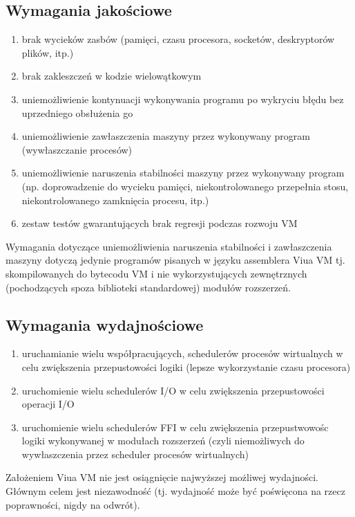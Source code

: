 \documentclass[11pt,oneside,a4paper,titlepage,onecolumn]{article}
\begin{document}
\subsection{Wymagania jakościowe}

\begin{enumerate}
    \item brak wycieków zasbów (pamięci, czasu procesora, socketów, deskryptorów plików, itp.)
    \item brak zakleszczeń w kodzie wielowątkowym
    \item uniemożliwienie kontynuacji wykonywania programu po wykryciu błędu bez uprzedniego obsłużenia go
    \item uniemożliwienie zawłaszczenia maszyny przez wykonywany program (wywłaszczanie procesów)
    \item uniemożliwienie naruszenia stabilności maszyny przez wykonywany program (np. doprowadzenie do
        wycieku pamięci, niekontrolowanego przepełnia stosu, niekontrolowanego zamknięcia procesu, itp.)
    \item zestaw testów gwarantujących brak regresji podczas rozwoju VM
\end{enumerate}

Wymagania dotyczące uniemożliwienia naruszenia stabilności i zawłaszczenia maszyny dotyczą jedynie programów
pisanych w języku assemblera Viua VM tj. skompilowanych do bytecodu VM i nie wykorzystujących zewnętrznych
(pochodzących spoza biblioteki standardowej) modułów rozszerzeń.

\subsection{Wymagania wydajnościowe}

\begin{enumerate}
    \item uruchamianie wielu współpracujących, schedulerów procesów wirtualnych w celu zwiększenia
        przepustowości logiki (lepsze wykorzystanie czasu procesora)
    \item uruchomienie wielu schedulerów I/O w celu zwiększenia przepustowości operacji I/O
    \item uruchomienie wielu schedulerów FFI w celu zwiększenia przepustwowośc logiki wykonywanej w modułach
        rozszerzeń (czyli niemożliwych do wywłaszczenia przez scheduler procesów wirtualnych)
\end{enumerate}

Założeniem Viua VM nie jest osiągnięcie najwyższej możliwej wydajności. Głównym celem jest niezawodność (tj.
wydajność może być poświęcona na rzecz poprawności, nigdy na odwrót).
\end{document}
